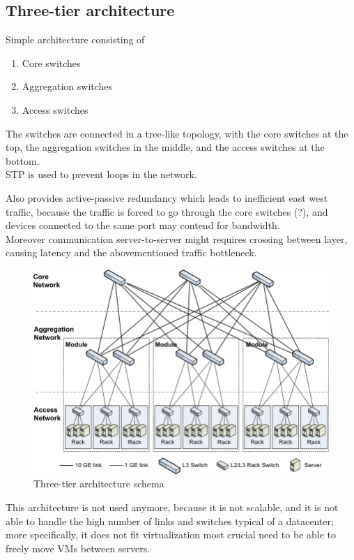 \subsection{Three-tier architecture}
\begin{paracol}{2}
   
   Simple architecture consisting of\ns
   \begin{enumerate}
      \item Core switches
      \item Aggregation switches
      \item Access switches
   \end{enumerate}\ns
   The switches are connected in a tree-like topology, with the core switches at the top, the aggregation switches in the middle, and the access switches at the bottom.\\
   STP is used to prevent loops in the network.

   Also provides active-passive redundancy which leads to inefficient east west traffic, because the traffic is forced to go through the core switches (?), and devices connected to the same port may contend for bandwidth.\\
   Moreover communication server-to-server might requires crossing between layer, causing latency and the abovementioned traffic bottleneck.
   
   \switchcolumn
   
   \colfill
   \begin{figure}[htbp]
      \centering
      \includegraphics{images/3tier_switches.png}
      \caption{Three-tier architecture schema}
      \label{fig:3tier_switches}
   \end{figure}
   \colfill
   
\end{paracol}
This architecture is not used anymore, because it is not scalable, and it is not able to handle the high number of links and switches typical of a datacenter; more specifically, it does not fit virtualization most crucial need to be able to freely move VMs between servers.

